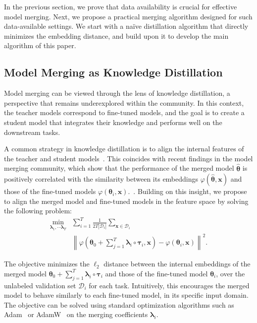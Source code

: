     
        




In the previous section, we prove that data availability is crucial for effective model merging. 
Next, we propose a practical merging algorithm designed for such data-available settings. We start with a na\"ive distillation algorithm that directly minimizes the embedding distance, and build upon it to develop the main algorithm of this paper. 

\subsection{Model Merging as Knowledge Distillation}
Model merging can be viewed through the lens of knowledge distillation, a perspective that remains underexplored within the community. In this context, the teacher models correspond to fine-tuned models, and the goal is to create a student model that integrates their knowledge and performs well on the downstream tasks. 

A common strategy in knowledge distillation is to align the internal features of the teacher and student models~\citep{young2022feature,jin2024align}. This coincides with recent findings in the model merging community, which show that the performance of the merged model $\hat{\boldsymbol{\theta}}$ is positively correlated with the similarity between its embeddings $\varphi(\hat{\boldsymbol{\theta}}, \boldsymbol{x})$ and those of the fine-tuned models $\varphi(\boldsymbol{\theta}_i, \boldsymbol{x})$.~\citep{zhou2023going, yang2024representation}. 
Building on this insight,
we propose to align the merged model and fine-tuned models in the feature space by solving the following problem:
{
\begin{align}\label{eq:obj_naive}\min_{\boldsymbol{\lambda}_1, \cdots \boldsymbol{\lambda}_T}&\sum_{i=1}^{T}\frac{1}{2T|\mathcal{D}_{i}|}\sum_{\boldsymbol{x}\in\mathcal{D}_i}
\nonumber\\&\left\|\varphi\left(\boldsymbol{\theta}_{0}+\sum_{j=1}^{T}\boldsymbol{\lambda}_{i}\circ \boldsymbol{\tau}_{i}, \boldsymbol{x}\right) -\varphi\left(\boldsymbol{\theta}_{i},\boldsymbol{x}\right)\right\|^{2}.\end{align} }

The objective minimizes the $\ell_2$ distance between the internal embeddings of the merged model $\boldsymbol{\theta}_{0}+\sum_{j=1}^{T}\boldsymbol{\lambda}_{i}\circ \boldsymbol{\tau}_{i}$ and those of the fine-tuned model $\boldsymbol{\theta}_i$, over the unlabeled validation set $\mathcal{D}_i$ for each task.
Intuitively, this encourages the merged model to behave similarly to each fine-tuned model, in its specific input domain.
The objective can be solved using standard optimization algorithms such as Adam~\citep{kingma2014adam} or AdamW~\citep{loshchilov2017decoupled} on the merging coefficients $\boldsymbol{\lambda}_i$.

